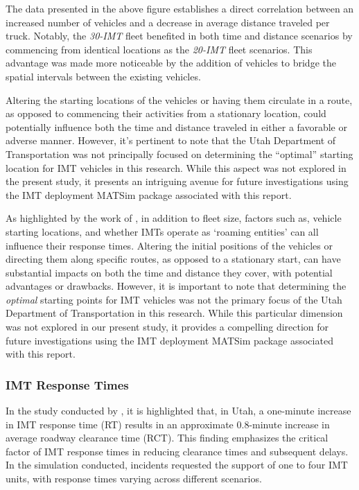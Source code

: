 \documentclass[
  letterpaper,
  authoryear]{elsarticle}
\begin{document}
The data presented in the above figure establishes a direct correlation
between an increased number of vehicles and a decrease in average
distance traveled per truck. Notably, the \emph{30-IMT} fleet benefited
in both time and distance scenarios by commencing from identical
locations as the \emph{20-IMT} fleet scenarios. This advantage was made
more noticeable by the addition of vehicles to bridge the spatial
intervals between the existing vehicles.

Altering the starting locations of the vehicles or having them circulate
in a route, as opposed to commencing their activities from a stationary
location, could potentially influence both the time and distance
traveled in either a favorable or adverse manner. However, it's
pertinent to note that the Utah Department of Transportation was not
principally focused on determining the ``optimal'' starting location for
IMT vehicles in this research. While this aspect was not explored in the
present study, it presents an intriguing avenue for future
investigations using the IMT deployment MATSim package associated with
this report.

As highlighted by the work of \citet{lou2011}, in addition to fleet
size, factors such as, vehicle starting locations, and whether IMTs
operate as `roaming entities' can all influence their response times.
Altering the initial positions of the vehicles or directing them along
specific routes, as opposed to a stationary start, can have substantial
impacts on both the time and distance they cover, with potential
advantages or drawbacks. However, it is important to note that
determining the \emph{optimal} starting points for IMT vehicles was not
the primary focus of the Utah Department of Transportation in this
research. While this particular dimension was not explored in our
present study, it provides a compelling direction for future
investigations using the IMT deployment MATSim package associated with
this report.

\hypertarget{imt-response-times}{%
\subsubsection{IMT Response Times}\label{imt-response-times}}

In the study conducted by \citet{schultz2019}, it is highlighted that,
in Utah, a one-minute increase in IMT response time (RT) results in an
approximate 0.8-minute increase in average roadway clearance time (RCT).
This finding emphasizes the critical factor of IMT response times in
reducing clearance times and subsequent delays. In the simulation
conducted, incidents requested the support of one to four IMT units,
with response times varying across different scenarios.
\end{document}

